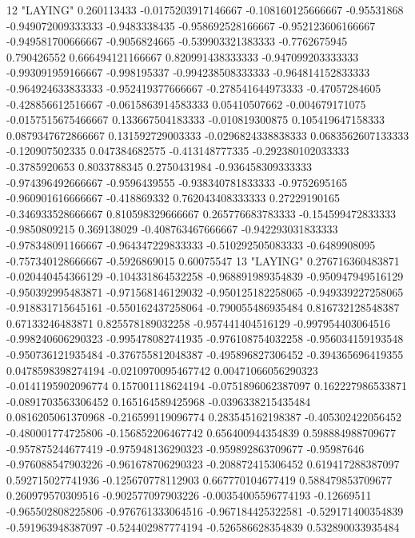 12 "LAYING" 0.260113433 -0.0175203917146667 -0.108160125666667 -0.95531868 -0.949072009333333 -0.9483338435 -0.958692528166667 -0.952123606166667 -0.949581700666667 -0.9056824665 -0.539903321383333 -0.7762675945 0.790426552 0.666494121166667 0.820991438333333 -0.947099203333333 -0.993091959166667 -0.998195337 -0.994238508333333 -0.964814152833333 -0.964924633833333 -0.952419377666667 -0.278541644973333 -0.47057284605 -0.428856612516667 -0.0615863914583333 0.05410507662 -0.004679171075 -0.0157515675466667 0.133667504183333 -0.010819300875 0.105419647158333 0.0879347672866667 0.131592729003333 -0.0296824338838333 0.0683562607133333 -0.120907502335 0.047384682575 -0.413148777335 -0.292380102033333 -0.3785920653 0.8033788345 0.2750431984 -0.936458309333333 -0.974396492666667 -0.9596439555 -0.938340781833333 -0.9752695165 -0.960901616666667 -0.418869332 0.762043408333333 0.27229190165 -0.346933528666667 0.810598329666667 0.265776683783333 -0.154599472833333 -0.9850809215 0.369138029 -0.408763467666667 -0.942293031833333 -0.978348091166667 -0.964347229833333 -0.510292505083333 -0.6489908095 -0.757340128666667 -0.5926869015 0.60075547
13 "LAYING" 0.276716360483871 -0.020440454366129 -0.104331864532258 -0.968891989354839 -0.950947949516129 -0.950392995483871 -0.971568146129032 -0.950125182258065 -0.949339227258065 -0.918831715645161 -0.550162437258064 -0.790055486935484 0.816732128548387 0.67133246483871 0.825578189032258 -0.957441404516129 -0.997954403064516 -0.998240606290323 -0.995478082741935 -0.976108754032258 -0.956034159193548 -0.950736121935484 -0.376755812048387 -0.495896827306452 -0.394365696419355 0.0478598398274194 -0.0210970095467742 0.00471066056290323 -0.0141195902096774 0.157001118624194 -0.0751896062387097 0.162227986533871 -0.0891703563306452 0.165164589425968 -0.0396338215435484 0.0816205061370968 -0.216599119096774 0.283545162198387 -0.405302422056452 -0.480001774725806 -0.156852206467742 0.656400944354839 0.598884988709677 -0.957875244677419 -0.975948136290323 -0.959892863709677 -0.95987646 -0.976088547903226 -0.961678706290323 -0.208872415306452 0.619417288387097 0.592715027741936 -0.125670778112903 0.667770104677419 0.588479853709677 0.260979570309516 -0.902577097903226 -0.00354005596774193 -0.12669511 -0.965502808225806 -0.976761333064516 -0.967184425322581 -0.529171400354839 -0.591963948387097 -0.524402987774194 -0.526586628354839 0.532890033935484
